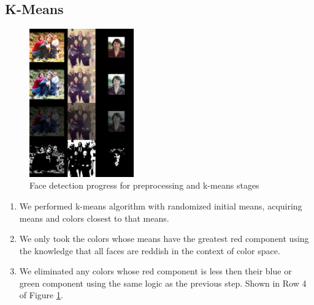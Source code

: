 \documentclass[conference]{IEEEtran}
\begin{document}
\subsection{K-Means}
\begin{figure}[h]
    \centering
    \includegraphics[width=0.4\textwidth]{resources/Progress 1.jpeg}
    \caption{Face detection progress for preprocessing and k-means stages}
    \label{fig:pro1}
\end{figure}
\begin{enumerate}
	\item \label{step:B1} We performed k-means algorithm with randomized initial means, acquiring means and colors closest to that means.
	\item \label{step:B2} We only took the colors whose means have the greatest red component using the knowledge that all faces are reddish in the context of color space.
	\item \label{step:B3} We eliminated any colors whose red component is less then their blue or green component using the same logic as the previous step. Shown in Row 4 of Figure \ref{fig:pro1}.
\end{enumerate}
\end{document}
